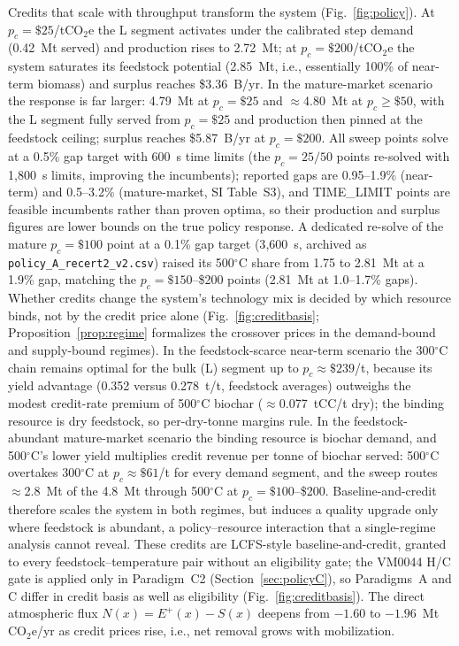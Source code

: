 Credits that scale with throughput transform the system (Fig.~\ref{fig:policy}).
At $p_c=\$25$/tCO$_2$e the L segment activates under the calibrated step
demand (0.42~Mt served) and production
rises to 2.72~Mt; at $p_c=\$200$/tCO$_2$e the system saturates its feedstock
potential (2.85~Mt, i.e., essentially 100\% of near-term biomass) and surplus
reaches \$3.36~B/yr. In the
mature-market scenario the response is far larger: 4.79~Mt at $p_c=\$25$ and
$\approx$4.80~Mt at $p_c\ge\$50$, with the L segment fully served from
$p_c=\$25$ and production then pinned at the feedstock ceiling; surplus
reaches \$5.87~B/yr at $p_c=\$200$.
All sweep points solve at a 0.5\% gap target with 600~s time limits (the
$p_c=25/50$ points re-solved with 1{,}800~s limits, improving the
incumbents); reported
gaps are 0.95--1.9\% (near-term) and 0.5--3.2\% (mature-market, SI
Table~S3), and TIME\_LIMIT points are feasible incumbents rather than proven
optima, so their production and surplus figures are lower bounds on
the true policy response. A dedicated re-solve of the mature
$p_c=\$100$ point at a 0.1\% gap target (3{,}600~s, archived as
\texttt{policy\_A\_recert2\_v2.csv}) raised its 500$^\circ$C share from
1.75 to 2.81~Mt at a 1.9\% gap, matching the $p_c=\$150$--\$200 points
(2.81~Mt at 1.0--1.7\% gaps).
Whether credits change the system's technology mix is decided by
which resource binds, not by the credit price alone (Fig.~\ref{fig:creditbasis};
Proposition~\ref{prop:regime} formalizes the crossover prices in the
demand-bound and supply-bound regimes).
In the feedstock-scarce near-term scenario the 300$^\circ$C chain remains
optimal for the bulk (L) segment up to $p_c\approx\$239$/t, because its
yield advantage (0.352 versus 0.278~t/t, feedstock averages) outweighs the modest credit-rate premium
of 500$^\circ$C biochar ($\approx$0.077~tCC/t dry); the binding resource is dry
feedstock, so per-dry-tonne margins rule. In the feedstock-abundant
mature-market scenario the binding resource is biochar demand, and
500$^\circ$C's lower yield multiplies credit revenue per tonne of biochar
served: 500$^\circ$C overtakes 300$^\circ$C at $p_c\approx\$61$/t for every
demand segment, and the sweep routes $\approx$2.8~Mt of the 4.8~Mt through
500$^\circ$C at $p_c=\$100$--\$200. Baseline-and-credit therefore scales the system
in both regimes, but induces a quality upgrade only where feedstock is
abundant, a policy--resource interaction that a single-regime analysis
cannot reveal.
These credits are LCFS-style baseline-and-credit, granted to every
feedstock--temperature pair without an eligibility gate; the VM0044 H/C
gate is applied only in Paradigm~C2 (Section~\ref{sec:policyC}), so Paradigms~A
and C differ in credit basis as well as eligibility
(Fig.~\ref{fig:creditbasis}). The direct atmospheric flux $N(x)=E^{+}(x)-S(x)$
deepens from $-1.60$ to $-1.96$~Mt CO$_2$e/yr as credit prices rise, i.e., net
removal grows with mobilization.

